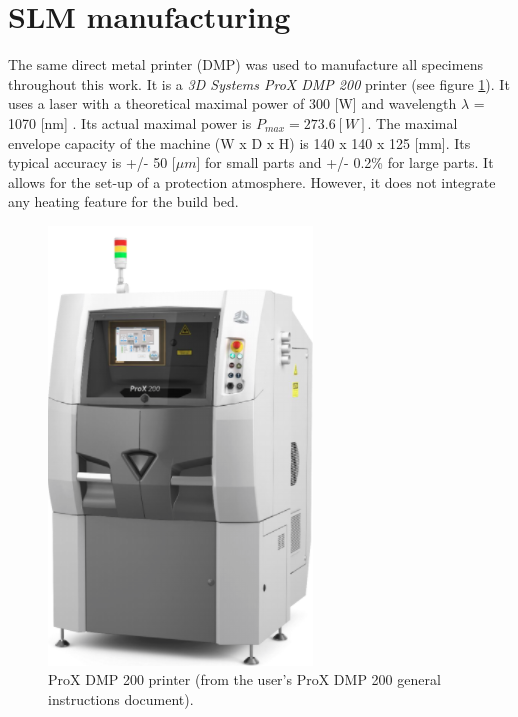 \section{SLM manufacturing}
\label{MMFPP}
The same direct metal printer (DMP) was used to manufacture all specimens throughout this work. It is a \textit{3D Systems ProX DMP 200} printer (see figure \ref{fig:Printer}). It uses a laser with a theoretical maximal power of 300 [W] and wavelength $\lambda$ = 1070 [nm] \parencite{3D}. Its actual maximal power is $P_{max}=273.6 [W]$. The maximal envelope capacity of the machine (W x D x H) is 140 x 140 x 125 [mm]. Its typical accuracy is +/- 50 [$\mu m$] for small parts and +/- 0.2\% for large parts. It allows for the set-up of a protection atmosphere. However, it does not integrate any heating feature for the build bed.\\

\begin{figure}[ht]
\centering
\includegraphics[scale=0.7]{Images/Printer}
\decoRule
\caption[ProX DMP 200 printer]{ProX DMP 200 printer (from the user's ProX DMP 200 general instructions document).}
\label{fig:Printer}
\end{figure}

